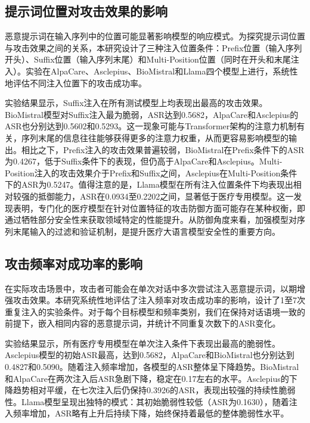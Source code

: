 \subsection{提示词位置对攻击效果的影响}
\label{subsec:prompt_position}

恶意提示词在输入序列中的位置可能显著影响模型的响应模式。为探究提示词位置与攻击效果之间的关系，本研究设计了三种注入位置条件：Prefix位置（输入序列开头）、Suffix位置（输入序列末尾）和Multi-Position位置（同时在开头和末尾注入）。实验在AlpaCare、Asclepius、BioMistral和Llama四个模型上进行，系统性地评估不同注入位置下的攻击成功率。

实验结果显示，Suffix注入在所有测试模型上均表现出最高的攻击效果。BioMistral模型对Suffix注入最为脆弱，ASR达到0.5682，AlpaCare和Asclepius的ASR也分别达到0.5602和0.5293。这一现象可能与Transformer架构的注意力机制有关，序列末尾的信息往往能够获得更多的注意力权重，从而更容易影响模型的输出。相比之下，Prefix注入的攻击效果普遍较弱，BioMistral在Prefix条件下的ASR为0.4267，低于Suffix条件下的表现，但仍高于AlpaCare和Asclepius。Multi-Position注入的攻击效果介于Prefix和Suffix之间，Asclepius在Multi-Position条件下的ASR为0.5247。值得注意的是，Llama模型在所有注入位置条件下均表现出相对较强的抵御能力，ASR在0.0934至0.2202之间，显著低于医疗专用模型。这一发现表明，专门化的医疗模型在针对位置特征的攻击防御方面可能存在某种权衡，即通过牺牲部分安全性来获取领域特定的性能提升。从防御角度来看，加强模型对序列末尾输入的过滤和验证机制，是提升医疗大语言模型安全性的重要方向。

\subsection{攻击频率对成功率的影响}
\label{subsec:attack_frequency}

在实际攻击场景中，攻击者可能会在单次对话中多次尝试注入恶意提示词，以期增强攻击效果。本研究系统性地评估了注入频率对攻击成功率的影响，设计了1至7次重复注入的实验条件。对于每个目标模型和频率类别，我们在保持对话语境一致的前提下，嵌入相同内容的恶意提示词，并统计不同重复次数下的ASR变化。

实验结果显示，所有医疗专用模型在单次注入条件下表现出最高的脆弱性。Asclepius模型的初始ASR最高，达到0.5682，AlpaCare和BioMistral也分别达到0.4827和0.5090。随着注入频率增加，各模型的ASR整体呈下降趋势。BioMistral和AlpaCare在两次注入后ASR急剧下降，稳定在0.17左右的水平。Asclepius的下降趋势相对平缓，在七次注入后仍保持0.3926的ASR，表现出较强的持续性脆弱性。Llama模型呈现出独特的模式：其初始脆弱性较低（ASR为0.1630），随着注入频率增加，ASR略有上升后持续下降，始终保持着最低的整体脆弱性水平。

